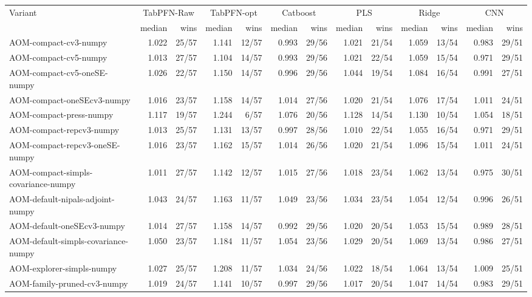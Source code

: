 \begin{tabular}{lrrrrrrrrrrrr}
\toprule
Variant & \multicolumn{2}{c}{TabPFN-Raw} & \multicolumn{2}{c}{TabPFN-opt} & \multicolumn{2}{c}{Catboost} & \multicolumn{2}{c}{PLS} & \multicolumn{2}{c}{Ridge} & \multicolumn{2}{c}{CNN} \\
 & median & wins & median & wins & median & wins & median & wins & median & wins & median & wins \\
\midrule
AOM-compact-cv3-numpy & 1.022 & 25/57 & 1.141 & 12/57 & 0.993 & 29/56 & 1.021 & 21/54 & 1.059 & 13/54 & 0.983 & 29/51 \\
AOM-compact-cv5-numpy & 1.013 & 27/57 & 1.104 & 14/57 & 0.993 & 29/56 & 1.021 & 22/54 & 1.059 & 15/54 & 0.971 & 29/51 \\
AOM-compact-cv5-oneSE-numpy & 1.026 & 22/57 & 1.150 & 14/57 & 0.996 & 29/56 & 1.044 & 19/54 & 1.084 & 16/54 & 0.991 & 27/51 \\
AOM-compact-oneSEcv3-numpy & 1.016 & 23/57 & 1.158 & 14/57 & 1.014 & 27/56 & 1.020 & 21/54 & 1.076 & 17/54 & 1.011 & 24/51 \\
AOM-compact-press-numpy & 1.117 & 19/57 & 1.244 & 6/57 & 1.076 & 20/56 & 1.128 & 14/54 & 1.130 & 10/54 & 1.054 & 18/51 \\
AOM-compact-repcv3-numpy & 1.013 & 25/57 & 1.131 & 13/57 & 0.997 & 28/56 & 1.010 & 22/54 & 1.055 & 16/54 & 0.971 & 29/51 \\
AOM-compact-repcv3-oneSE-numpy & 1.016 & 23/57 & 1.162 & 15/57 & 1.014 & 26/56 & 1.020 & 21/54 & 1.096 & 15/54 & 1.011 & 24/51 \\
AOM-compact-simpls-covariance-numpy & 1.011 & 27/57 & 1.142 & 12/57 & 1.015 & 27/56 & 1.018 & 23/54 & 1.062 & 13/54 & 0.975 & 30/51 \\
AOM-default-nipals-adjoint-numpy & 1.043 & 24/57 & 1.163 & 11/57 & 1.049 & 23/56 & 1.034 & 23/54 & 1.054 & 12/54 & 0.996 & 26/51 \\
AOM-default-oneSEcv3-numpy & 1.014 & 27/57 & 1.158 & 14/57 & 0.992 & 29/56 & 1.020 & 20/54 & 1.053 & 15/54 & 0.989 & 28/51 \\
AOM-default-simpls-covariance-numpy & 1.050 & 23/57 & 1.184 & 11/57 & 1.054 & 23/56 & 1.029 & 20/54 & 1.069 & 13/54 & 0.986 & 27/51 \\
AOM-explorer-simpls-numpy & 1.027 & 25/57 & 1.208 & 11/57 & 1.034 & 24/56 & 1.022 & 18/54 & 1.064 & 13/54 & 1.009 & 25/51 \\
AOM-family-pruned-cv3-numpy & 1.019 & 24/57 & 1.141 & 10/57 & 0.997 & 29/56 & 1.017 & 20/54 & 1.047 & 14/54 & 0.983 & 29/51 \\

\end{tabular}

